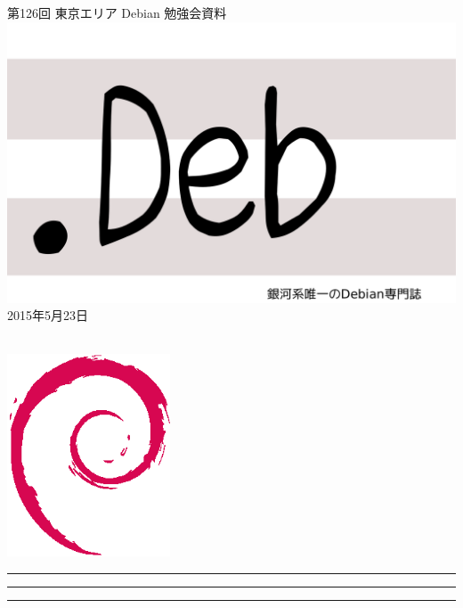 \documentclass[mingoth,a4paper]{jsarticle}
\newcommand{\debmtgyear}{2015}
\newcommand{\debmtgmonth}{5}
\newcommand{\debmtgdate}{23}
\newcommand{\debmtgnumber}{126}
\begin{document}
\begin{titlepage}
\thispagestyle{empty}

\vspace*{-2cm}
第\debmtgnumber{}回 東京エリア Debian 勉強会資料\\
\hspace*{-2cm}
\includegraphics{image2012-natsu/dotdeb.pdf}\\
\hfill{}\debmtgyear{}年\debmtgmonth{}月\debmtgdate{}日

\\

\vspace*{-2cm}
\hfill{}\includegraphics[height=6cm]{image200502/openlogo-nd.eps}
\end{titlepage}

\newpage

\begin{minipage}[b]{0.2\hsize}
 \colorbox{titleback}{}
\end{minipage}
\begin{minipage}[b]{0.8\hsize}
\hrule
\vspace{2mm}
\hrule
\begin{multicols}{2}
\tableofcontents
\end{multicols}
\vspace{2mm}
\hrule
\end{minipage}
\end{document}
